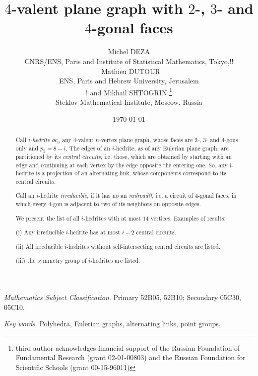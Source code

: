 \documentclass[12pt]{article}
\begin{document}
\title{$4$-valent plane graph with $2$-, $3$- and $4$-gonal faces}


\author{Michel DEZA \\
  CNRS/ENS, Paris and Institute of Statistical Mathematics, 
Tokyo,!!\\
\ Mathieu DUTOUR \\
 ENS, Paris and Hebrew University, Jerusalem\\
\!! and  Mikhail SHTOGRIN \thanks{third author acknowledges financial support 
of the Russian Foundation of Fundamental Research (grant 02-01-00803)
and the Russian Foundation for Scientific Schools (grant 00-15-96011)}\\
Steklov Mathematical Institute, Moscow, Russia} 
\date{\today}

\maketitle



\begin{abstract}
Call {\em $i$-hedrite $oc_n$} any $4$-valent $n$-vertex plane graph, whose 
faces are $2$-, $3$- and $4$-gons only and $p_2=8-i$. The edges of an $i$-hedrite, as of 
any Eulerian plane graph, are partitioned
by its {\em central circuits}, i.e. those, which are obtained by starting with an
edge and continuing at each vertex by the edge opposite the entering one. 
So, any i-hedrite is a projection of an alternating link, whose components
correspond to its central circuits.

Call an $i$-hedrite {\em irreducible}, if it has no an 
{\em railroad!!}, i.e. a 
circuit of $4$-gonal faces, in which every 4-gon is adjacent to two of its 
neighbors on opposite edges.

We present the list of all $i$-hedrites with at most $14$ vertices. Examples of results: 

(i) Any irreducible $i$-hedrite has at most $i-2$ central circuits.

(ii) All irreducible $i$-hedrites without self-intersecting central circuits are listed.

(iii) the symmetry group of $i$-hedrites are listed.

\end{abstract}

{\em Mathematics Subject Classification}. Primary 52B05, 52B10;
Secondary 05C30, 05C10.

{\em Key words}. Polyhedra, Eulerian graphs, alternating links, point groups.
\end{document}
